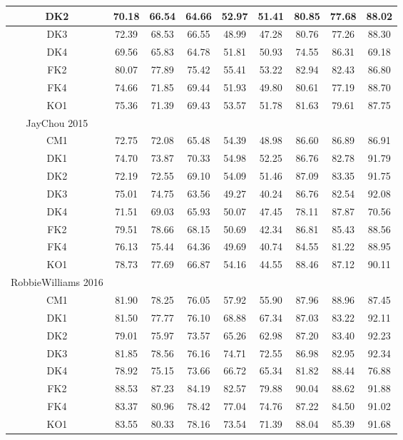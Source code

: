 \begin{table*}[htb]
\begin{tabular}{|c|c|c|c|c|c|c|c|c|}
DK2 & 70.18 & 66.54 & 64.66 & 52.97 & 51.41 & 80.85 & 77.68 & 88.02\\ \hline
DK3 & 72.39 & 68.53 & 66.55 & 48.99 & 47.28 & 80.76 & 77.26 & 88.30\\ \hline
DK4 & 69.56 & 65.83 & 64.78 & 51.81 & 50.93 & 74.55 & 86.31 & 69.18\\ \hline
FK2 & 80.07 & 77.89 & 75.42 & 55.41 & 53.22 & 82.94 & 82.43 & 86.80\\ \hline
FK4 & 74.66 & 71.85 & 69.44 & 51.93 & 49.80 & 80.61 & 77.19 & 88.70\\ \hline
KO1 & 75.36 & 71.39 & 69.43 & 53.57 & 51.78 & 81.63 & 79.61 & 87.75\\ \hline
JayChou 2015 \\ \hline
CM1 & 72.75 & 72.08 & 65.48 & 54.39 & 48.98 & 86.60 & 86.89 & 86.91\\ \hline
DK1 & 74.70 & 73.87 & 70.33 & 54.98 & 52.25 & 86.76 & 82.78 & 91.79\\ \hline
DK2 & 72.19 & 72.55 & 69.10 & 54.09 & 51.46 & 87.09 & 83.35 & 91.75\\ \hline
DK3 & 75.01 & 74.75 & 63.56 & 49.27 & 40.24 & 86.76 & 82.54 & 92.08\\ \hline
DK4 & 71.51 & 69.03 & 65.93 & 50.07 & 47.45 & 78.11 & 87.87 & 70.56\\ \hline
FK2 & 79.51 & 78.66 & 68.15 & 50.69 & 42.34 & 86.81 & 85.43 & 88.56\\ \hline
FK4 & 76.13 & 75.44 & 64.36 & 49.69 & 40.74 & 84.55 & 81.22 & 88.95\\ \hline
KO1 & 78.73 & 77.69 & 66.87 & 54.16 & 44.55 & 88.46 & 87.12 & 90.11\\ \hline
RobbieWilliams 2016 \\ \hline
CM1 & 81.90 & 78.25 & 76.05 & 57.92 & 55.90 & 87.96 & 88.96 & 87.45\\ \hline
DK1 & 81.50 & 77.77 & 76.10 & 68.88 & 67.34 & 87.03 & 83.22 & 92.11\\ \hline
DK2 & 79.01 & 75.97 & 73.57 & 65.26 & 62.98 & 87.20 & 83.40 & 92.23\\ \hline
DK3 & 81.85 & 78.56 & 76.16 & 74.71 & 72.55 & 86.98 & 82.95 & 92.34\\ \hline
DK4 & 78.92 & 75.15 & 73.66 & 66.72 & 65.34 & 81.82 & 88.44 & 76.88\\ \hline
FK2 & 88.53 & 87.23 & 84.19 & 82.57 & 79.88 & 90.04 & 88.62 & 91.88\\ \hline
FK4 & 83.37 & 80.96 & 78.42 & 77.04 & 74.76 & 87.22 & 84.50 & 91.02\\ \hline
KO1 & 83.55 & 80.33 & 78.16 & 73.54 & 71.39 & 88.04 & 85.39 & 91.68\\ \hline
\end{tabular}
\end{table*}
